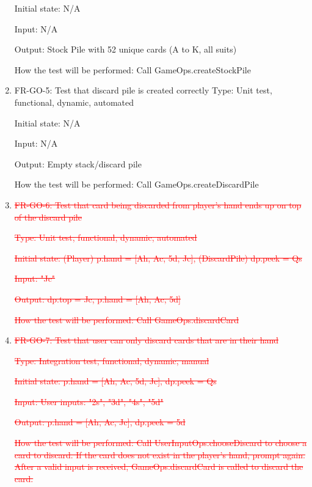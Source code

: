 \documentclass[12pt, titlepage]{article}
\begin{document}
\begin{enumerate}
    Initial state: N/A
    
    Input: N/A
    
    Output: Stock Pile with 52 unique cards (A to K, all suits)
    
    How the test will be performed: Call GameOps.createStockPile
    
    \item{FR-GO-5: Test that discard pile is created correctly}
    Type: Unit test, functional, dynamic, automated
    
    Initial state: N/A
    
    Input: N/A
    
    Output: Empty stack/discard pile
    
    How the test will be performed: Call GameOps.createDiscardPile
    
    \item{\textcolor{red}{\sout{FR-GO-6: Test that card being discarded from player's hand ends up on top of the discard pile}}}
    
    \textcolor{red}{\sout{Type: Unit test, functional, dynamic, automated}}
    
    \textcolor{red}{\sout{Initial state: (Player) p.hand = [Ah, Ac, 5d, Jc], (DiscardPile) dp.peek = Qs}}
    
    \textcolor{red}{\sout{Input: "Jc"}}
    
    \textcolor{red}{\sout{Output: dp.top = Jc, p.hand = [Ah, Ac, 5d]}}
    
    \textcolor{red}{\sout{How the test will be performed: Call GameOps.discardCard}}
    
    \item{\textcolor{red}{\sout{FR-GO-7: Test that user can only discard cards that are in their hand}}}
    
    \textcolor{red}{\sout{Type: Integration test, functional, dynamic, manual}}
    
    \textcolor{red}{\sout{Initial state: p.hand = [Ah, Ac, 5d, Jc], dp.peek = Qs}}
    
    \textcolor{red}{\sout{Input: User inputs: "2s", "3d", "4s", "5d"}}
    
    \textcolor{red}{\sout{Output: p.hand = [Ah, Ac, Jc], dp.peek = 5d}}
    
    \textcolor{red}{\sout{How the test will be performed: Call UserInputOps.chooseDiscard to choose a card to discard. If the card does not exist in the player's hand, prompt again. After a valid input is received, GameOps.discardCard is called to discard the card.}}
    

\end{enumerate}
\end{document}
